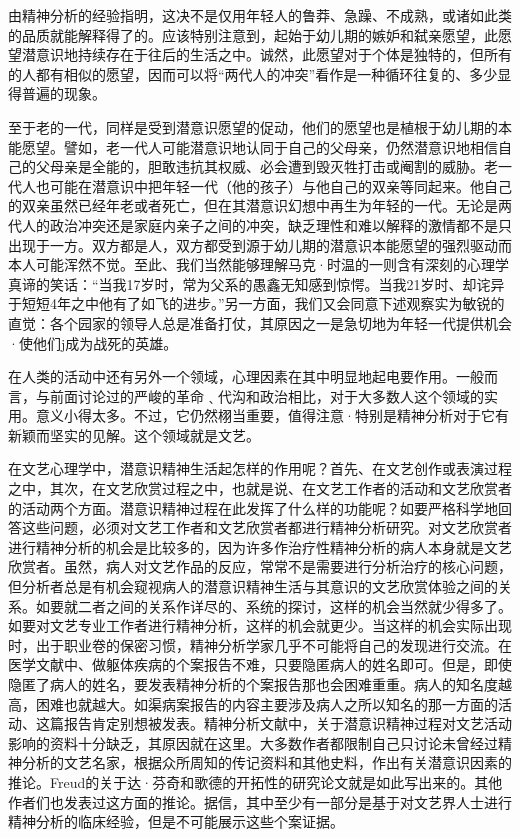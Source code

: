 \documentclass[UTF8,10pt,a4paper,openany]{book}
\begin{document}
由精神分析的经验指明，这决不是仅用年轻人的鲁莽、急躁、不成熟，或诸如此类的品质就能解释得了的。应该特别注意到，起始于幼儿期的嫉妒和弑亲愿望，此愿望潜意识地持续存在于往后的生活之中。诚然，此愿望对于个体是独特的，但所有的人都有相似的愿望，因而可以将“两代人的冲突”看作是一种循环往复的、多少显得普遍的现象。

至于老的一代，同样是受到潜意识愿望的促动，他们的愿望也是植根于幼儿期的本能愿望。譬如，老一代人可能潜意识地认同于自己的父母亲，仍然潜意识地相信自己的父母亲是全能的，胆敢违抗其权威、必会遭到毁灭牲打击或阉割的威胁。老一代人也可能在潜意识中把年轻一代（他的孩子）与他自己的双亲等同起来。他自己的双亲虽然已经年老或者死亡，但在其潜意识幻想中再生为年轻的一代。无论是两代人的政治冲突还是家庭内亲子之间的冲突，缺乏理性和难以解释的激情都不是只出现于一方。双方都是人，双方都受到源于幼儿期的潜意识本能愿望的强烈驱动而本人可能浑然不觉。至此、我们当然能够理解马克·时温的一则含有深刻的心理学真谛的笑话：“当我17岁时，常为父系的愚鑫无知感到惊愕。当我21岁时、却诧异于短短4年之中他有了如飞的进步。”另一方面，我们又会同意下述观察实为敏锐的直觉：各个园家的领导人总是准备打仗，其原因之一是急切地为年轻一代提供机会·使他们j成为战死的英雄。

在人类的活动中还有另外一个领域，心理因素在其中明显地起电要作用。一般而言，与前面讨论过的严峻的革命﹑代沟和政治相比，对于大多数人这个领域的实用。意义小得太多。不过，它仍然栩当重要，值得注意·特别是精神分析对于它有新颖而坚实的见解。这个领域就是文艺。

在文艺心理学中，潜意识精神生活起怎样的作用呢？首先、在文艺创作或表演过程之中，其次，在文艺欣赏过程之中，也就是说、在文艺工作者的活动和文艺欣赏者的活动两个方面。潜意识精神过程在此发挥了什么样的功能呢？如要严格科学地回答这些问题，必须对文艺工作者和文艺欣赏者都进行精神分析研究。对文艺欣赏者进行精神分析的机会是比较多的，因为许多作治疗性精神分析的病人本身就是文艺欣赏者。虽然，病人对文艺作品的反应，常常不是需要进行分析治疗的核心问题，但分析者总是有机会窥视病人的潜意识精神生活与其意识的文艺欣赏体验之间的关系。如要就二者之间的关系作详尽的、系统的探讨，这样的机会当然就少得多了。如要对文艺专业工作者进行精神分析，这样的机会就更少。当这样的机会实际出现时，出于职业卷的保密习惯，精神分析学家几乎不可能将自己的发现进行交流。在医学文献中、做躯体疾病的个案报告不难，只要隐匿病人的姓名即可。但是，即使隐匿了病人的姓名，要发表精神分析的个案报告那也会困难重重。病人的知名度越高，困难也就越大。如渠病案报告的内容主要涉及病人之所以知名的那一方面的活动、这篇报告肯定别想被发表。精神分析文献中，关于潜意识精神过程对文艺活动影响的资料十分缺乏，其原因就在这里。大多数作者都限制自己只讨论未曾经过精神分析的文艺名家，根据众所周知的传记资料和其他史料，作出有关潜意识因素的推论。Freud的关于达·芬奇和歌德的开拓性的研究论文就是如此写出来的。其他作者们也发表过这方面的推论。据信，其中至少有一部分是基于对文艺界人士进行精神分析的临床经验，但是不可能展示这些个案证据。
\end{document}

